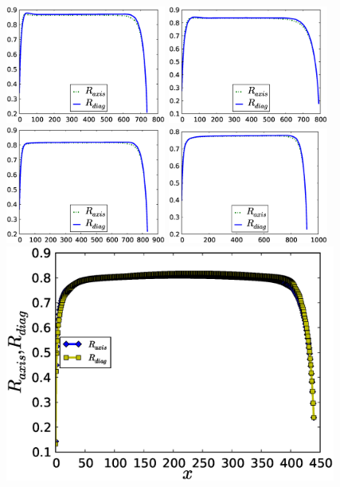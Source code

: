 \documentclass{article}
\begin{document}
\begin{figure}[ht]
\includegraphics[width=0.47\textwidth]{Figures/bubble_length_ca_36.eps}\hfill
\includegraphics[width=0.47\textwidth]{Figures/bubble_length_ca_46.eps}\\
\includegraphics[width=0.47\textwidth]{Figures/bubble_length_ca_61.eps}\hfill
\includegraphics[width=0.47\textwidth]{Figures/bubble_length_ca_88.eps}\\
\includegraphics[width=0.97\textwidth]{Figures/bubble_length_ca_one.eps}

\end{figure}
\end{document}
